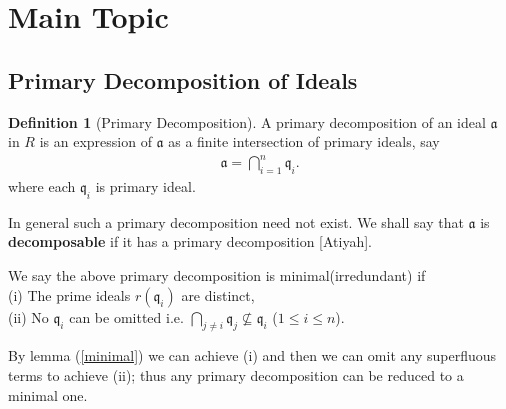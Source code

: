 \documentclass[	DIV=calc,paper=a4,fontsize=11pt]{scrartcl}	 					%
\theoremstyle{definition}
\newtheorem{defn}[thm]{Definition}
\theoremstyle{plain}
\theoremstyle{remark}
\begin{document}
\section{Main Topic}

\subsection{Primary Decomposition of Ideals}


\begin{defn}[Primary Decomposition]
A primary decomposition of an ideal $\mathfrak{a}$ in $R$ is an expression of $\mathfrak{a}$ as a finite intersection of primary ideals, say
\begin{align}
\mathfrak{a}=\bigcap_{i=1}^{n}\mathfrak{q}_i.
\end{align}
where each $\mathfrak{q}_i$ is primary ideal.
\end{defn}
In general such a primary decomposition need not exist. We shall say that $\mathfrak{a}$ is \textbf{decomposable} if it has a primary decomposition [Atiyah].

\medskip

We say the above primary decomposition is minimal(irredundant) if\\
(i) The prime ideals $r(\mathfrak{q}_i)$ are distinct,\\
(ii) No $\mathfrak{q}_i$ can be omitted i.e. $\bigcap_{j\neq i} \mathfrak{q}_j\nsubseteq \mathfrak{q}_i$ ($1\le i\le n$).
\medskip

By lemma (\ref{minimal}) we can achieve (i) and then we can omit any superfluous terms to achieve (ii); thus any primary decomposition can be reduced to a minimal one.
\end{document}
